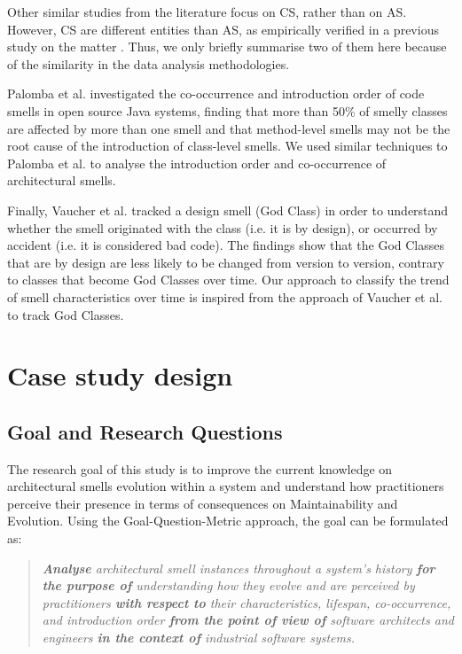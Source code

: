 Other similar studies from the literature focus on CS, rather than on AS. However, CS are different entities than AS, as empirically verified in a previous study on the matter \cite{Arcelli2019}. Thus, we only briefly summarise two of them here because of the similarity in the data analysis methodologies.

Palomba et al. \cite{Palomba2018} investigated the co-occurrence and introduction order of code smells in open source Java systems, finding that more than 50\% of smelly classes are affected by more than one smell and that method-level smells may not be the root cause of the introduction of class-level smells.
We used similar techniques to Palomba et al. to analyse the introduction order and co-occurrence of architectural smells.

Finally, Vaucher et al. \cite{Vaucher2009} tracked a design smell (God Class) in order to understand whether the smell originated with the class (i.e. it is by design), or occurred by accident (i.e. it is considered bad code).
The findings show that the God Classes that are by design are less likely to be changed from version to version, contrary to classes that become God Classes over time.
Our approach to classify the trend of smell characteristics over time is inspired from the approach of Vaucher et al. to track God Classes.


\section{Case study design}\label{c4:sec:case-study}

\subsection{Goal and Research Questions}
The research goal of this study is to improve the current knowledge on architectural smells evolution within a system and understand how practitioners perceive their presence in terms of consequences on Maintainability and Evolution.
Using the Goal-Question-Metric \cite{VanSolingen2002} approach, the goal can be formulated as: 
\begin{quote}
    \itshape
    \textbf{Analyse} architectural smell instances throughout a system's history \textbf{for the purpose of} understanding how they evolve and are perceived by practitioners \textbf{with respect to} their characteristics, lifespan, co-occurrence, and introduction order \textbf{from the point of view of} software architects and engineers \textbf{in the context of} industrial software systems.
\end{quote}

